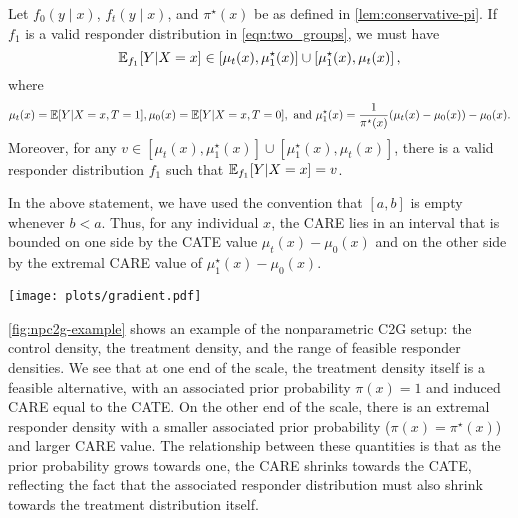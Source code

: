 \begin{corollary}
\label{corr:np-ite}
Let $f_0(y \mid x)$, $f_t(y \mid x)$, and $\pi^\star(x)$ be as defined in \cref{lem:conservative-pi}. If $f_1$ is a valid responder distribution in \cref{eqn:two_groups}, we must have 
\[ \mathbb{E}_{f_1}[Y|X=x] \in \left[\mu_t(x),  \mu_1^\star(x) \right] \cup \left[\mu_1^\star(x), \mu_t(x) \right], \]
where 
\begin{align*}
\mu_t(x) = \mathbb{E}[Y | X=x, T=1], 
\mu_0(x) = \mathbb{E}[Y | X=x, T=0], \text{ and }
\mu_1^\star(x) = \frac{1}{\pi^\star(x)}(\mu_t(x) - \mu_0(x))  - \mu_0(x).
\end{align*}
Moreover, for any $v \in \left[\mu_t(x),  \mu_1^\star(x)\right] \cup \left[\mu_1^\star(x), \mu_t(x) \right]$, there is a valid responder distribution $f_1$ such that $\mathbb{E}_{f_1}[Y|X=x] = v$.
\end{corollary}
In the above statement, we have used the convention that $[a,b]$ is empty whenever $b<a$. Thus, for any individual $x$, the CARE lies in an interval that is bounded on one side by the CATE value $\mu_t(x) - \mu_0(x)$ and on the other side by the extremal CARE value of $\mu_1^\star(x) - \mu_0(x)$.

\begin{figure*}
\centering
\texttt{[image: plots/gradient.pdf]}
\caption{Nonparametric C2G example. \emph{Left:} An example of a non-responder density (black), a treatment density (red), an extremal responder density (blue), and the range of feasible responder densities (gradient). \emph{Right:} Each feasible responder density has an associated prior probability and CARE value.}
\label{fig:npc2g-example}
\end{figure*}

\cref{fig:npc2g-example} shows an example of the nonparametric C2G setup: the control density, the treatment density, and the range of feasible responder densities. We see that at one end of the scale, the treatment density itself is a feasible alternative, with an associated prior probability $\pi(x) = 1$ and induced CARE equal to the CATE. On the other end of the scale, there is an extremal responder density with a smaller associated prior probability ($\pi(x) = \pi^\star(x)$) and larger CARE value. The relationship between these quantities is that as the prior probability grows towards one, the CARE shrinks towards the CATE, reflecting the fact that the associated responder distribution must also shrink towards the treatment distribution itself.



